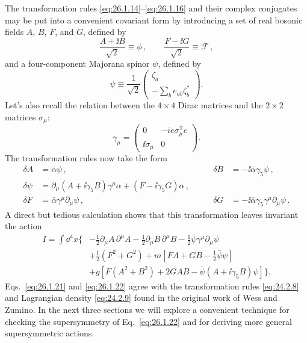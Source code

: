 The transformation rules \eqref{eq:26.1.14}--\eqref{eq:26.1.16} and their
complex conjugates may be put into a convenient covariant form by introducing
a set of real bosonic fields \(A\), \(B\), \(F\), and \(G\), defined by
\begin{equation}
  \frac{A+\ii B}{\sqrt{2}}\equiv\phi\,,
  \qquad
  \frac{F-\ii G}{\sqrt{2}}\equiv\mathcal{F}\,,
  \tag{26.1.19}\label{eq:26.1.19}
\end{equation}
and a four-component Majorana spinor \(\psi\), defined by
\begin{equation}
  \psi\equiv\frac{1}{\sqrt{2}}
  \begin{pmatrix}
    \zeta_a\\
    \displaystyle-\sum_b e_{ab}\zeta_b^*
  \end{pmatrix}.
  \tag{26.1.20}\label{eq:26.1.20}
\end{equation}
Let's also recall the relation between the \(4\times4\) Dirac matrices and the
\(2\times2\) matrices \(\sigma_\mu\):
\[
  \gamma_\mu=
  \begin{pmatrix}
    0&-ie\sigma_\mu^{\mathsf T} e\\
    \ii\sigma_\mu&0
  \end{pmatrix}.
\]
The transformation rules now take the form
\begin{equation}
  \begin{aligned}
    \delta A&=\bar{\alpha}\psi\,,
    &\qquad
    \delta B&=-\ii\bar{\alpha}\gamma_5\psi\,,
    \\
    \delta\psi
    &=\partial_\mu(A+\ii\gamma_5B)\gamma^\mu\alpha
      +(F-\ii\gamma_5G)\alpha\,,
    \\
    \delta F&=\bar{\alpha}\gamma^\mu\partial_\mu\psi\,,
    &\qquad
    \delta G&=-\ii\bar{\alpha}\gamma_5\gamma^\mu\partial_\mu\psi\,.
  \end{aligned}
  \tag{26.1.21}\label{eq:26.1.21}
\end{equation}
A direct but tedious calculation shows that this transformation leaves
invariant the action
\begin{equation}
  \begin{aligned}
  I=\int \dd^4x\biggl\{
    &-\frac12\partial_\mu A\,\partial^\mu A
     -\frac12\partial_\mu B\,\partial^\mu B
     -\frac12\bar{\psi}\gamma^\mu\partial_\mu\psi
  \\
    &+\frac12(F^2+G^2)
     +m\left[FA+GB-\frac12\bar{\psi}\psi\right]
  \\
    &+g\left[F(A^2+B^2)+2GAB
      -\bar{\psi}(A+\ii\gamma_5B)\psi\right]\biggr\}.
  \end{aligned}
  \tag{26.1.22}\label{eq:26.1.22}
\end{equation}
Eqs.~\eqref{eq:26.1.21} and \eqref{eq:26.1.22} agree with the transformation
rules \eqref{eq:24.2.8} and Lagrangian density \eqref{eq:24.2.9} found in the
original work of Wess and Zumino. In the next three sections we will explore a
convenient technique for checking the supersymmetry of
Eq.~\eqref{eq:26.1.22} and for deriving more general supersymmetric actions.

